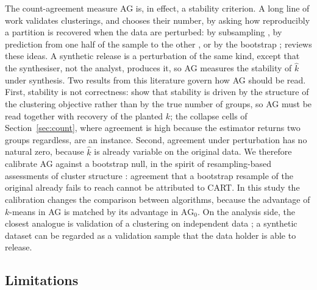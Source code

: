 \documentclass[pdflatex,referee]{sn-jnl}
\begin{document}
The count-agreement measure AG is, in effect, a stability criterion. A long
line of work validates clusterings, and chooses their number, by asking how
reproducibly a partition is recovered when the data are perturbed: by
subsampling \citep{levine2001,benhur2002}, by prediction from one half of the
sample to the other \citep{dudoit2002,lange2004,tibshirani2005,wang2010}, or by
the bootstrap \citep{jain1987,hennig2007,fang2012}; \citet{luxburg2010} reviews
these ideas. A synthetic release is a perturbation of the same kind, except
that the synthesiser, not the analyst, produces it, so AG measures the
stability of $\hat{k}$ under synthesis. Two results from this literature
govern how AG should be read. First, stability is not correctness:
\citet{bendavid2006} show that stability is driven by the structure of the
clustering objective rather than by the true number of groups, so AG must be
read together with recovery of the planted $k$; the collapse cells of
Section~\ref{sec:count}, where agreement is high because the estimator
returns two groups regardless, are an instance. Second, agreement under
perturbation has no natural zero, because $\hat{k}$ is already variable on the
original data. We therefore calibrate AG against a bootstrap null, in the
spirit of resampling-based assessments of cluster structure
\citep{suzuki2006,maitra2012}: agreement that a bootstrap resample of the
original already fails to reach cannot be attributed to CART. In this study
the calibration changes the comparison between algorithms, because the
advantage of $k$-means in AG is matched by its advantage in $\mathrm{AG}_0$. On
the analysis side, the closest analogue is validation of a clustering on
independent data \citep{ullmann2022}; a synthetic dataset can be regarded as a
validation sample that the data holder is able to release.

\subsection{Limitations}
\label{sec:limitations}
\end{document}
